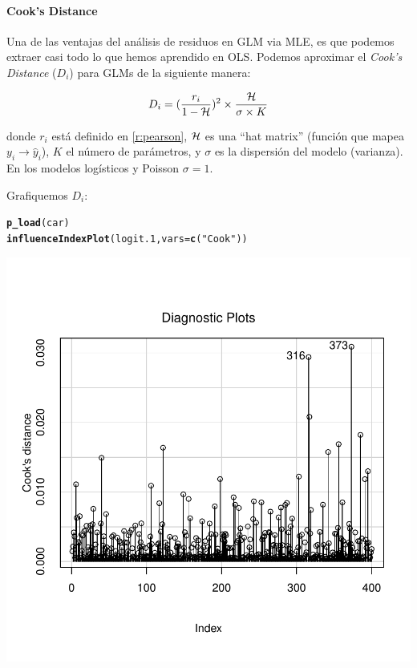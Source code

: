 \documentclass[onesided]{article}\usepackage[]{graphicx}\usepackage[]{color}
\makeatletter
\def\maxwidth{ %
  \ifdim\Gin@nat@width>\linewidth
    \linewidth
  \else
    \Gin@nat@width
  \fi
}
\newcommand{\hlstr}[1]{\textcolor[rgb]{0.192,0.494,0.8}{#1}}%
\newcommand{\hlstd}[1]{\textcolor[rgb]{0.345,0.345,0.345}{#1}}%
\newcommand{\hlkwc}[1]{\textcolor[rgb]{0.333,0.667,0.333}{#1}}%
\newcommand{\hlkwd}[1]{\textcolor[rgb]{0.737,0.353,0.396}{\textbf{#1}}}%
\newenvironment{kframe}{%
 \def\at@end@of@kframe{}%
 \ifinner\ifhmode%
  \def\at@end@of@kframe{\end{minipage}}%
  \begin{minipage}{\columnwidth}%
 \fi\fi%
 \def\FrameCommand##1{\hskip\@totalleftmargin \hskip-\fboxsep
 \colorbox{shadecolor}{##1}\hskip-\fboxsep
     \hskip-\linewidth \hskip-\@totalleftmargin \hskip\columnwidth}%
 \MakeFramed {\advance\hsize-\width
   \@totalleftmargin\z@ \linewidth\hsize
   \@setminipage}}%
 {\par\unskip\endMakeFramed%
 \at@end@of@kframe}
\newenvironment{knitrout}{}{} %
\makeatother
\begin{document}
\paragraph{Cook's Distance} Una de las ventajas del an\'alisis de residuos en GLM via MLE, es que podemos extraer casi todo lo que hemos aprendido en OLS. Podemos aproximar el \emph{Cook's Distance} ($D_{i}$) para GLMs de la siguiente manera:

\begin{equation}
D_{i} = (\frac{r_{i}}{1-\cal{H}})^{2} \times \frac{\cal{H}}{\sigma \times K}
\end{equation}

donde $r_{i}$ est\'a definido en \autoref{r:pearson}, $\cal{H}$ es una ``hat matrix'' (funci\'on que mapea $y_{i} \rightarrow \hat{y}_{i}$), $K$ el n\'umero de par\'ametros, y $\sigma$ es la dispersi\'on del modelo (varianza). En los modelos log\'isticos y Poisson $\sigma=1$.


Grafiquemos $D_{i}$:

\begin{knitrout}
\color{fgcolor}\begin{kframe}
\begin{alltt}
\hlkwd{p_load}\hlstd{(car)}
\hlkwd{influenceIndexPlot}\hlstd{(logit.1,} \hlkwc{vars}\hlstd{=}\hlkwd{c}\hlstd{(}\hlstr{"Cook"}\hlstd{))}
\end{alltt}
\end{kframe}

{\centering \includegraphics[width=\maxwidth]{figure/d:plot-1} 

}



\end{knitrout}
\end{document}
